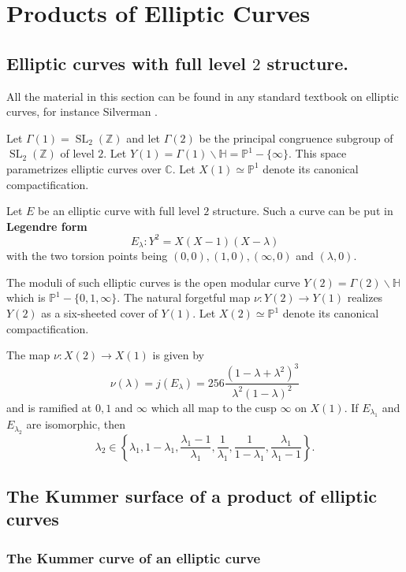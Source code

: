 \documentclass[11pt,a4paper]{article}
\newcommand {\ZZ}{{\mathds Z}}
\newcommand {\C}{{\mathds C}}
\newcommand {\HH}{{\mathds H}}
\newcommand {\LA}{{\lambda}}
\newcommand {\CP}{{\mathds P}}
\newcommand {\lb}{{\lambda}}
\DeclareMathOperator{\SL}{SL}
\begin{document}
\section{Products of Elliptic Curves}



 


\subsection{Elliptic curves with full level $2$ structure.}

All the material in this section can be found in any standard textbook on elliptic curves, for instance Silverman \cite{silv}. 

Let $\Gamma(1)=\SL_2(\ZZ)$ and let $\Gamma(2)$ be the principal congruence subgroup of $\SL_2(\ZZ)$ of level $2$. Let $Y(1)=\Gamma(1)\backslash \HH=\CP^1-\{\infty\}$. This space parametrizes elliptic curves over $\C$. Let $X(1) \simeq \CP^1$ denote its canonical compactification. 


Let $E$ be an elliptic curve with full level $2$ structure. Such a curve can be put in {\bf Legendre form} 
%
$$E_{\LA}:Y^2=X(X-1)(X-\LA)$$
%
with the two torsion points being $(0,0),(1,0),(\infty,0)$ and $(\LA,0)$.

The moduli of such elliptic curves is the open modular curve $Y(2)=\Gamma(2)\backslash \HH$ which is $\CP^1-\{0,1,\infty\}$. The natural forgetful map $\nu: Y(2) \to Y(1)$ realizes $Y(2)$ as a six-sheeted cover of $Y(1)$. Let $X(2)\simeq \CP^1$ denote its canonical compactification. 


The map $\nu:X(2)\longrightarrow X(1)$ is given by 
%
$$\nu(\lb)= j(E_{\lb})=256 \frac{(1-\lb+\lb^2)^3}{\lb^2(1-\lb)^2}$$
%
and is ramified at $0,1$ and $\infty$ which all map to the cusp $\infty$ on $X(1)$. If 
 $E_{\lb_1}$ and $E_{\lb_2}$ are isomorphic, then 
 $$\lb_2 \in \left\{\lb_1,1-\lb_1, \frac{\lb_1-1}{\lb_1},\frac{1}{\lb_1},\frac{1}{1-\lb_1},\frac{\lb_1}{\lb_1-1} \right\}.$$
 
 
 \subsection{The Kummer surface of a product of elliptic curves}
 
 \subsubsection{The Kummer curve of an elliptic curve}
\end{document}
